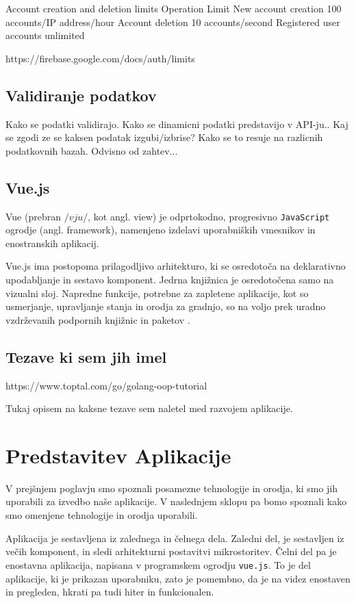 \documentclass[a4paper, 12pt]{book}
\begin{document}
Account creation and deletion limits
Operation	Limit
New account creation	100 accounts/IP address/hour
Account deletion	10 accounts/second
Registered user accounts	unlimited

https://firebase.google.com/docs/auth/limits



\section{Validiranje podatkov}

Kako se podatki validirajo. Kako se dinamicni podatki predstavijo v API-ju..
Kaj se zgodi ze se kaksen podatak izgubi/izbrise? Kako se to resuje na razlicnih podatkovnih bazah. Odvisno od zahtev...


\section{Vue.js}
\label{vue-js-section}
Vue (prebran $/vju/$, kot angl. view) je odprtokodno, progresivno \verb=JavaScript= ogrodje (angl. framework), namenjeno izdelavi uporabniških vmesnikov in enostranskih aplikacij.

Vue.js ima postopoma prilagodljivo arhitekturo, ki se osredotoča na deklarativno upodabljanje in sestavo komponent. Jedrna knjižnica je osredotočena samo na vizualni sloj. Napredne funkcije, potrebne za zapletene aplikacije, kot so usmerjanje, upravljanje stanja in orodja za gradnjo, so na voljo prek uradno vzdrževanih podpornih knjižnic in paketov \cite{vue-js-what-is}.


\section{Tezave ki sem jih imel}
https://www.toptal.com/go/golang-oop-tutorial

Tukaj opisem na kaksne tezave sem naletel med razvojem aplikacije.

\chapter{Predstavitev Aplikacije}
V prejšnjem poglavju smo spoznali posamezne tehnologije in orodja, ki smo jih uporabili za izvedbo naše aplikacije. V naslednjem sklopu pa bomo spoznali kako smo omenjene tehnologije in orodja uporabili. 

Aplikacija je sestavljena iz zalednega in čelnega dela. Zaledni del, je sestavljen iz večih komponent, in sledi arhitekturni postavitvi mikrostoritev. Čelni del pa je enostavna aplikacija, napisana v programskem ogrodju \verb=vue.js=. To je del aplikacije, ki je prikazan uporabniku, zato je pomembno, da je na videz enostaven in pregleden, hkrati pa tudi hiter in funkcionalen. 
\end{document}
